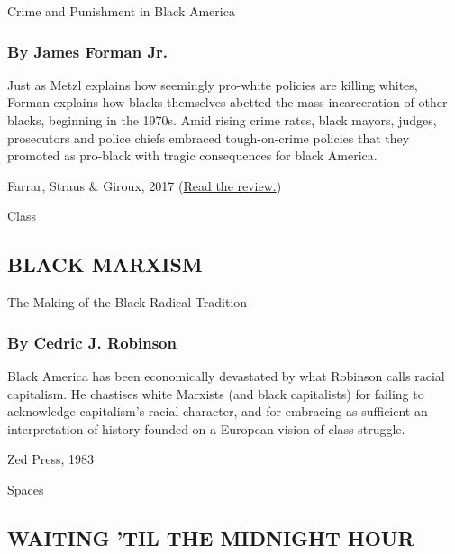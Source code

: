 Crime and Punishment in Black America

\hypertarget{by-james-forman-jr}{%
\subsubsection{\texorpdfstring{\textbf{By James Forman
Jr.}}{By James Forman Jr.}}\label{by-james-forman-jr}}

Just as Metzl explains how seemingly pro-white policies are killing
whites, Forman explains how blacks themselves abetted the mass
incarceration of other blacks, beginning in the 1970s. Amid rising crime
rates, black mayors, judges, prosecutors and police chiefs embraced
tough-on-crime policies that they promoted as pro-black with tragic
consequences for black America.

Farrar, Straus \& Giroux, 2017
(\href{https://www.nytimes.com/2017/04/14/books/review/locking-up-our-own-james-forman-jr-colony-in-nation-chris-hayes.html}{Read
the review.})

Class

\hypertarget{black-marxism}{%
\subsection{BLACK MARXISM}\label{black-marxism}}

The Making of the Black Radical Tradition

\hypertarget{by-cedric-j-robinson}{%
\subsubsection{\texorpdfstring{\textbf{By Cedric J.
Robinson}}{By Cedric J. Robinson}}\label{by-cedric-j-robinson}}

Black America has been economically devastated by what Robinson calls
racial capitalism. He chastises white Marxists (and black capitalists)
for failing to acknowledge capitalism's racial character, and for
embracing as sufficient an interpretation of history founded on a
European vision of class struggle.

Zed Press, 1983

Spaces

\hypertarget{waiting-til-the-midnight-hour}{%
\subsection{WAITING 'TIL THE MIDNIGHT
HOUR}\label{waiting-til-the-midnight-hour}}

